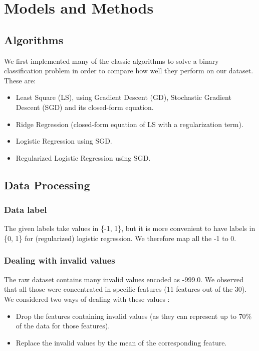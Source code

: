 \documentclass[10pt,conference,compsocconf]{IEEEtran}
\begin{document}
\section{Models and Methods}

\subsection{Algorithms}\label{sec:algo}

We first implemented many of the classic algorithms to solve a binary classification problem in order to compare how well they perform on our dataset. These are:
\begin{itemize}
    \item Least Square (LS), using Gradient Descent (GD), Stochastic Gradient Descent (SGD) and its closed-form equation.
    \item Ridge Regression (closed-form equation of LS with a regularization term).
    \item Logistic Regression using SGD.
    \item Regularized Logistic Regression using SGD.
\end{itemize}

\subsection{Data Processing}

\subsubsection{Data label}
The given labels take values in \{-1, 1\}, but it is more convenient to have labels in \{0, 1\} for (regularized) logistic regression. We therefore map all the -1 to 0.

\subsubsection{Dealing with invalid values}
The raw dataset contains many invalid values encoded as -999.0. We observed that all those were concentrated in specific features (11 features out of the 30). We considered two ways of dealing with these values :
\begin{itemize}
    \item Drop the features containing invalid values (as they can represent up to 70\% of the data for those features).
    \item Replace the invalid values by the mean of the corresponding feature.
\end{itemize}
\end{document}
